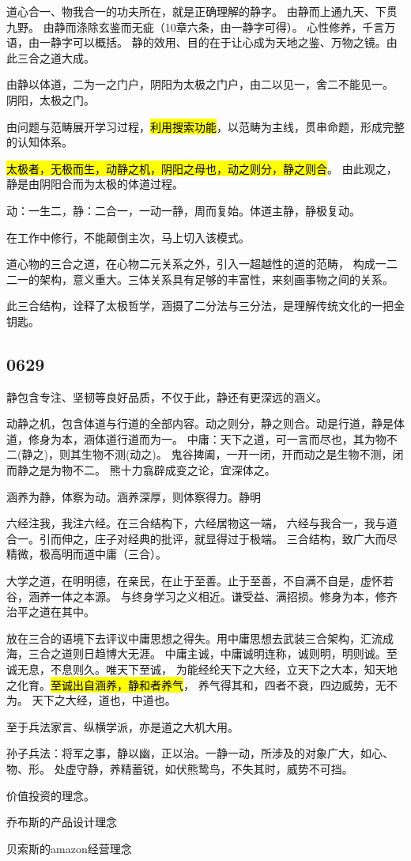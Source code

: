 道心合一、物我合一的功夫所在，就是正确理解的静字。
由静而上通九天、下贯九野。
由静而涤除玄鉴而无疵（10章六条，由一静字可得）。
心性修养，千言万语，由一静字可以概括。
静的效用、目的在于让心成为天地之鉴、万物之镜。由此三合之道大成。

由静以体道，二为一之门户，阴阳为太极之门户，由二以见一，舍二不能见一。
阴阳，太极之门。


由问题与范畴展开学习过程，\hl{利用搜索功能}，以范畴为主线，贯串命题，形成完整的认知体系。

\hl{太极者，无极而生，动静之机，阴阳之母也，动之则分，静之则合}。
由此观之，静是由阴阳合而为太极的体道过程。

动：一生二，静：二合一，一动一静，周而复始。体道主静，静极复动。

在工作中修行，不能颠倒主次，马上切入该模式。

道心物的三合之道，在心物二元关系之外，引入一超越性的道的范畴，
构成一二二一的架构，意义重大。三体关系具有足够的丰富性，来刻画事物之间的关系。

此三合结构，诠释了太极哲学，涵摄了二分法与三分法，是理解传统文化的一把金钥匙。

\subsection{0629}

静包含专注、坚韧等良好品质，不仅于此，静还有更深远的涵义。

动静之机，包含体道与行道的全部内容。动之则分，静之则合。动是行道，静是体道，修身为本，涵体道行道而为一。
中庸：天下之道，可一言而尽也，其为物不二(静之)，则其生物不测(动之)。
鬼谷捭阖，一开一闭，开而动之是生物不测，闭而静之是为物不二。
熊十力翕辟成变之论，宜深体之。

涵养为静，体察为动。涵养深厚，则体察得力。静明

六经注我，我注六经。在三合结构下，六经居物这一端，
六经与我合一，我与道合一。引而伸之，庄子对经典的批评，就显得过于极端。
三合结构，致广大而尽精微，极高明而道中庸（三合）。

大学之道，在明明德，在亲民，在止于至善。止于至善，不自满不自是，虚怀若谷，涵养一体之本源。
与终身学习之义相近。谦受益、满招损。修身为本，修齐治平之道在其中。

放在三合的语境下去评议中庸思想之得失。用中庸思想去武装三合架构，汇流成海，三合之道则日趋博大无涯。
中庸主诚，中庸诚明连称，诚则明，明则诚。至诚无息，不息则久。唯天下至诚，
为能经纶天下之大经，立天下之大本，知天地之化育。\hl{至诚出自涵养，静和者养气}，
养气得其和，四者不衰，四边威势，无不为。
天下之大经，道也，中道也。

至于兵法家言、纵横学派，亦是道之大机大用。

孙子兵法：将军之事，静以幽，正以治。一静一动，所涉及的对象广大，如心、物、形。
处虚守静，养精蓄锐，如伏熊鸷鸟，不失其时，威势不可挡。

价值投资的理念。

乔布斯的产品设计理念

贝索斯的amazon经营理念
